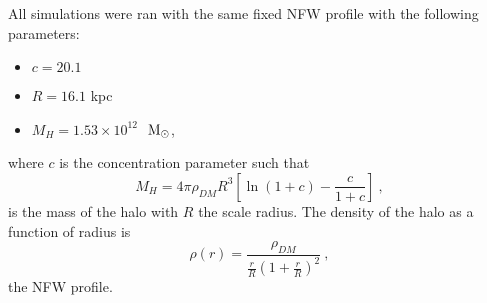 All simulations were ran with the same fixed NFW profile with the following parameters:
\begin{itemize}
    \item $c = 20.1$
    \item $R = 16.1$ kpc
    \item $M_{H} = 1.53 \times 10^{12}$ $~\mathrm{M}_{\odot}$,
\end{itemize}
where $c$ is the concentration parameter such that
$$
    M_{H} = 4\pi \rho_{DM} R^3 \left[ \ln (1 + c) - \frac{c}{1+c} \right]~,
$$
is the mass of the halo with $R$ the scale radius.
The density of the halo as a function of radius is 
\begin{equation}
    \rho(r) = \frac{\rho_{DM}}{\frac{r}{R} \left( 1 + \frac{r}{R} \right)^2}~,
    \label{eqn:nfw}
\end{equation}
the NFW profile.
